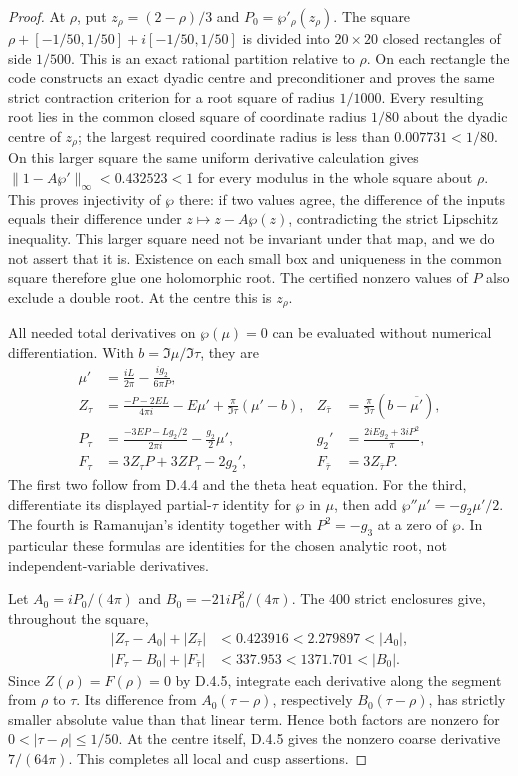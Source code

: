 \begin{proof}
At $\rho$, put $z_\rho=(2-\rho)/3$ and $P_0=\wp'_\rho(z_\rho)$.
The square $\rho+[-1/50,1/50]+i[-1/50,1/50]$ is divided into
$20\times20$ closed rectangles of side $1/500$. This is an exact
rational partition relative to $\rho$. On each rectangle the code
constructs an exact dyadic centre and preconditioner and proves the
same strict contraction criterion for a root square of radius
$1/1000$. Every resulting root lies in the common closed square of
coordinate radius $1/80$ about the dyadic centre of $z_\rho$; the
largest required coordinate radius is less than $0.007731<1/80$.
On this larger square the same uniform derivative calculation
gives $\|1-A\wp'\|_\infty<0.432523<1$ for every modulus in the
whole square about $\rho$. This proves injectivity of $\wp$ there:
if two values agree, the difference of the inputs equals their
difference under $z\mapsto z-A\wp(z)$, contradicting the strict
Lipschitz inequality. This larger square need not be invariant
under that map, and we do not assert that it is. Existence on each
small box and uniqueness in the common square therefore glue one
holomorphic root. The certified nonzero values of $P$ also exclude
a double root. At the centre this is $z_\rho$.

All needed total derivatives on $\wp(\mu)=0$ can be evaluated
without numerical differentiation. With $b=\Im\mu/\Im\tau$,
they are
\[
\begin{aligned}
 \mu'&=\frac{iL}{2\pi}-\frac{i g_2}{6\pi P},\\
 Z_\tau&=\frac{-P-2EL}{4\pi i}-E\mu'
                  +\frac\pi{\Im\tau}(\mu'-b),&
 Z_{\bar\tau}&=\frac\pi{\Im\tau}(b-\overline{\mu'}),\\
 P_\tau&=\frac{-3EP-Lg_2/2}{2\pi i}-\frac{g_2}2\mu',&
 g_2'&=\frac{2iEg_2+3iP^2}{\pi},\\
 F_\tau&=3Z_\tau P+3ZP_\tau-2g_2',&
 F_{\bar\tau}&=3Z_{\bar\tau}P.
\end{aligned}
\]
The first two follow from D.4.4 and the theta heat equation. For the
third, differentiate its displayed partial-$\tau$ identity for
$\wp$ in $\mu$, then add $\wp''\mu'=-g_2\mu'/2$.
The fourth is Ramanujan's identity together with $P^2=-g_3$ at a
zero of $\wp$. In particular these formulas are identities for
the chosen analytic root, not independent-variable derivatives.

Let $A_0=iP_0/(4\pi)$ and $B_0=-21iP_0^2/(4\pi)$. The
400 strict enclosures give, throughout the square,
\[
\begin{aligned}
 |Z_\tau-A_0|+|Z_{\bar\tau}|&<0.423916
                         <2.279897<|A_0|,\\
 |F_\tau-B_0|+|F_{\bar\tau}|&<337.953
                         <1371.701<|B_0|.
\end{aligned}
\]
Since $Z(\rho)=F(\rho)=0$ by D.4.5, integrate each derivative
along the segment from $\rho$ to $\tau$. Its difference from
$A_0(\tau-\rho)$, respectively $B_0(\tau-\rho)$, has strictly
smaller absolute value than that linear term. Hence both factors
are nonzero for $0<|\tau-\rho|\leq1/50$. At the centre itself,
D.4.5 gives the nonzero coarse derivative $7/(64\pi)$.
This completes all local and cusp assertions.
\end{proof}
